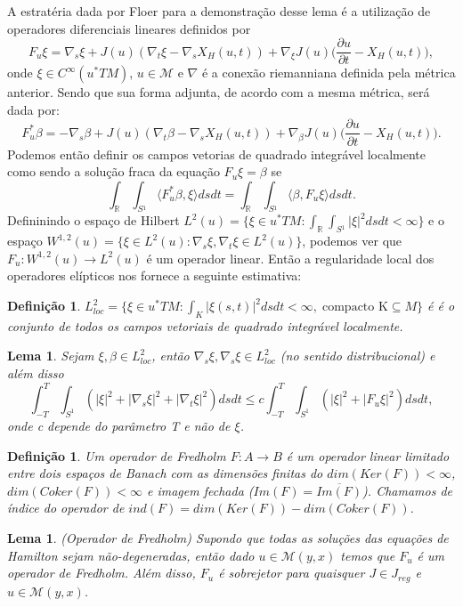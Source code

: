\documentclass[12pt]{book}
\newtheorem{lema}[teorema]{Lema}
\newtheorem{definicao}[teorema]{Definição}
\newcommand{\dparcial}[2]{\frac{\partial #1}{\partial #2}}
\newcommand{\iprod}[2]{\langle #1, #2 \rangle}
\newcommand{\real}[1]{\mathbb{R}^{#1}}
\newcommand{\vermelho}[1]{{\color{red}#1}}
\begin{document}
	A estratéria dada por Floer para a demonstração desse lema 
	é a utilização de operadores diferenciais lineares  definidos por 
	$$
	F_{u} \xi = \nabla_{s}\xi+J(u)(\nabla_{t}\xi - \nabla_{s}X_{H}(u,t))+\nabla_{\xi}J(u)\Big(\dparcial{u}{t}-X_{H}(u,t)\Big),
	$$
	onde $\xi \in C^{\infty}(u^{*}TM)$, $u \in \mathcal{M}$ e $\nabla$ é a conexão riemanniana definida pela métrica anterior. Sendo que sua forma adjunta, de acordo com a mesma métrica, será dada por:
	$$
	F_{u}^{*} \beta = -\nabla_{s}\beta+J(u)(\nabla_{t}\beta - \nabla_{s}X_{H}(u,t))+\nabla_{\beta}J(u)\Big(\dparcial{u}{t}-X_{H}(u,t)\Big).
	$$
	Podemos então definir 	os campos vetorias de quadrado integrável localmente como sendo a solução fraca da equação $F_{u}\xi = \beta$ se 
	$$
	\int_{\real{}} \int_{S{^{1}}} \iprod{F_{u}^{*}\beta}{\xi} dsdt= 
	\int_{\real{}} \int_{S{^{1}}} \iprod{\beta}{F_{u}\xi} dsdt.
	$$
	Defininindo o espaço de Hilbert $L^{2}(u) = \{\xi \in u^{*}TM: \int_{\real{}} \int_{S{^{1}}}|\xi|^{2} dsdt < \infty\}$ e o espaço $W^{1,2}(u) = \{\xi \in L^{2}(u):\nabla_{s} \xi,\nabla_{t} \xi \in L^{2}(u) \}$, podemos ver que $F_{u}: W^{1,2}(u) \to L^{2}(u)$ é um operador linear. \vermelho{Então a regularidade local dos operadores elípticos nos fornece a seguinte estimativa:}
	
	\begin{definicao}
		$L^{2}_{loc} = \{\xi \in u^{*}TM: \int_{K} |\xi(s,t)|^{2}dsdt <\infty, \; \text{compacto K} \subseteq M \}$ é é o conjunto de todos os campos vetoriais de quadrado integrável localmente.
	\end{definicao}
	
	\begin{lema}
		Sejam $\xi, \beta \in L^{2}_{loc}$, então $\nabla_{s}\xi, \nabla_{s}\xi \in L^{2}_{loc}$ (no sentido distribucional) e além disso
		$$
		\int_{-T}^{T}\int_{S^{1}}(|\xi|^{2}+|\nabla_{s}\xi|^{2}+|\nabla_{t}\xi|^{2})dsdt \leq c \int_{-T}^{T}\int_{S^{1}}(|\xi|^{2}+|F_{u}\xi|^{2})dsdt,
		$$
		onde c depende do parâmetro T e não de $\xi$.
	\end{lema}
	
	\begin{definicao}
		Um operador de Fredholm $F: A\to B$ é um operador linear limitado entre dois espaços de Banach com as dimensões finitas do $dim(Ker(F))< \infty$, $dim(Coker(F))< \infty$ e imagem fechada ($Im(F)=\overline{Im(F)}$). Chamamos de índice do operador de $ind (F)  = dim(Ker(F)) - dim(Coker(F))$.
	\end{definicao}
	
	\begin{lema}
		(Operador de Fredholm) Supondo que todas as soluções das equações de Hamilton sejam não-degeneradas, então dado $u \in \mathcal{M}(y,x)$ temos que $F_{u}$ é um operador de Fredholm. Além disso, $F_{u}$ é sobrejetor para quaisquer $J \in J_{reg}$ e $u \in \mathcal{M}(y,x)$.
	\end{lema}
	
\end{document}
